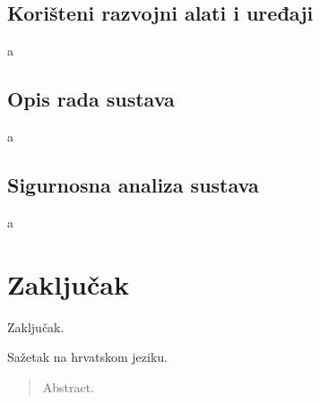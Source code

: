 \documentclass[times, utf8, diplomski]{fer}
\begin{document}
\section{Korišteni razvojni alati i uređaji}
a

\section{Opis rada sustava}
a

\section{Sigurnosna analiza sustava}
a


\chapter{Zaključak}
Zaključak.



\listoffigures
\listoftables

\begin{sazetak}
Sažetak na hrvatskom jeziku.

\end{sazetak}

\begin{abstract}
Abstract.

\end{abstract}
\end{document}
